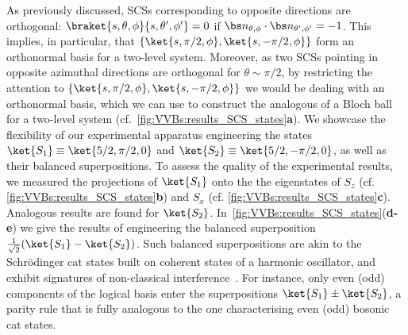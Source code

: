 As previously discussed, SCSs corresponding to opposite directions are orthogonal: $\braket{s,\theta,\phi}{s,\theta',\phi'}=0$ if $\bs n_{\theta,\phi}\cdot\bs n_{\theta',\phi'}=-1$.
This implies, in particular, that
$\{\ket{s,\pi/2,\phi},\ket{s,-\pi/2,\phi}\}$
form an orthonormal basis for a two-level system.
{\color{red}Moreover, as two \acp{SCS} pointing in opposite azimuthal directions are orthogonal for $\theta\sim\pi/2$, by restricting the attention to $\{\ket{s,\pi/2,\phi},\ket{s,-\pi/2,\phi}\}$ we would be dealing with an orthonormal basis, which we can use to construct the analogous of a Bloch ball for a two-level system (cf.~\cref{fig:VVBs:results_SCS_states}\textbf{a}).}
We showcase the flexibility of our experimental apparatus engineering the states $\ket{S_1}\equiv\ket{5/2,\pi/2,0}$ and $\ket{S_2}\equiv\ket{5/2,-\pi/2,0}$, as well as their balanced superpositions.
To assess the quality of the experimental results, we measured the projections of $\ket{S_1}$ onto the the eigenstates of $S_z$ (cf. \cref{fig:VVBs:results_SCS_states}\textbf{b}) and $S_x$ (cf. \cref{fig:VVBs:results_SCS_states}\textbf{c}). Analogous results are found for $\ket{S_2}$.
In~\cref{fig:VVBs:results_SCS_states}(\textbf{d-e}) we give the results of engineering the balanced superposition $\frac{1}{\sqrt{2}}(\ket{S_1}-\ket{S_2})$.
Such balanced superpositions are akin to the Schrödinger cat states built on coherent states of a harmonic oscillator, and exhibit signatures of non-classical interference~\cite{agarwal1997atomic}. For instance, only even (odd) components of the logical basis enter the superpositions $\ket{S_1}\pm\ket{S_2}$, a parity rule that is fully analogous to the one characterising even (odd) bosonic cat states.


